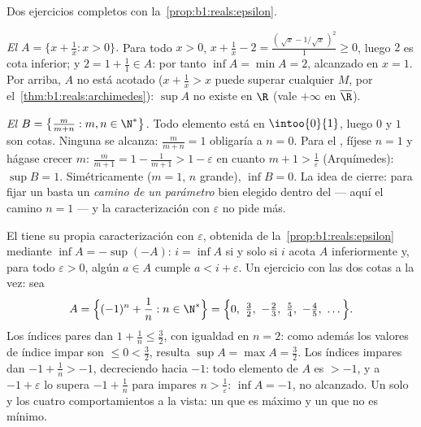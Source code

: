 \begin{example}\label{ex:b1:reals:supcompute}
Dos ejercicios completos con la~\cref{prop:b1:reals:epsilon}.

\emph{El  $A = \{x + \frac1x : x > 0\}$.} Para todo $x > 0$,
$x + \frac1x - 2 = \frac{(\,\sqrt x - 1/\sqrt x\,)^2}{1} \geq 0$, luego
$2$ es cota inferior; y $2 = 1 + \frac11 \in A$: por tanto
$\inf A = \min A = 2$, alcanzado en $x = 1$. Por arriba, $A$ no está
acotado ($x + \frac1x > x$ puede superar cualquier $M$, por
el~\cref{thm:b1:reals:archimedes}): $\sup A$ no existe en $\R$ (vale
$+\infty$ en $\overline\R$).

\emph{El  $B = \bigl\{\frac{m}{m + n} : m, n \in
\N^*\bigr\}$.} Todo elemento está en $\intoo{0}{1}$, luego $0$ y $1$
son cotas. Ninguna se alcanza: $\frac{m}{m+n} = 1$ obligaría a
$n = 0$. Para el , fíjese $n = 1$ y hágase crecer $m$:
$\frac{m}{m+1} = 1 - \frac{1}{m+1} > 1 - \varepsilon$ en cuanto
$m + 1 > \frac1\varepsilon$ (Arquímedes): $\sup B = 1$.
Simétricamente ($m = 1$, $n$ grande), $\inf B = 0$. La idea de cierre:
para fijar un  basta un \emph{camino de un parámetro} bien
elegido dentro del  --- aquí el camino $n = 1$ --- y la
caracterización con $\varepsilon$ no pide más.
\end{example}

\begin{example}\label{ex:b1:reals:infmirror}
El  tiene su propia caracterización con $\varepsilon$,
obtenida de la~\cref{prop:b1:reals:epsilon} mediante
$\inf A = -\sup(-A)$: $i = \inf A$ si y solo si $i$ acota $A$
inferiormente y, para todo $\varepsilon > 0$, algún $a \in A$ cumple
$a < i + \varepsilon$. Un ejercicio con las dos cotas a la vez: sea
\[
A = \Bigl\{(-1)^n + \frac1n : n \in \N^*\Bigr\}
= \Bigl\{0,\ \tfrac32,\ -\tfrac23,\ \tfrac54,\ -\tfrac45,\
\dots\Bigr\} .
\]
Los índices pares dan $1 + \frac1n \leq \frac32$, con igualdad en
$n = 2$: como además los valores de índice impar son $\leq 0 <
\frac32$, resulta $\sup A = \max A = \frac32$. Los índices impares dan
$-1 + \frac1n > -1$, decreciendo hacia $-1$: todo elemento de $A$ es
$> -1$, y a $-1 + \varepsilon$ lo supera $-1 + \frac1n$ para impares
$n > \frac1\varepsilon$: $\inf A = -1$, no alcanzado. Un solo
 y los cuatro comportamientos a la vista: un  que es
máximo y un \omterm{def:b1:reals:bounds}{ínfimo} que no es mínimo.
\end{example}

